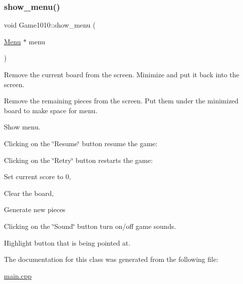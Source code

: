 \subsubsection{\texorpdfstring{show\+\_\+menu()}{show\_menu()}}
{\footnotesize\ttfamily void Game1010\+::show\+\_\+menu (\begin{DoxyParamCaption}\item[{\mbox{\hyperlink{class_menu}{Menu}} $\ast$}]{menu }\end{DoxyParamCaption})\hspace{0.3cm}{\ttfamily [inline]}}

Remove the current board from the screen. Minimize and put it back into the screen.

Remove the remaining pieces from the screen. Put them under the minimized board to make space for menu.

Show menu.

Clicking on the \char`\"{}\+Resume\char`\"{} button resume the game\+:

Clicking on the \char`\"{}\+Retry\char`\"{} button restarts the game\+:

Set current score to 0,

Clear the board,

Generate new pieces

Clicking on the \char`\"{}\+Sound\char`\"{} button turn on/off game sounds.

Highlight button that is being pointed at.

The documentation for this class was generated from the following file\+:\begin{DoxyCompactItemize}
\item 
\mbox{\hyperlink{main_8cpp}{main.\+cpp}}\end{DoxyCompactItemize}

